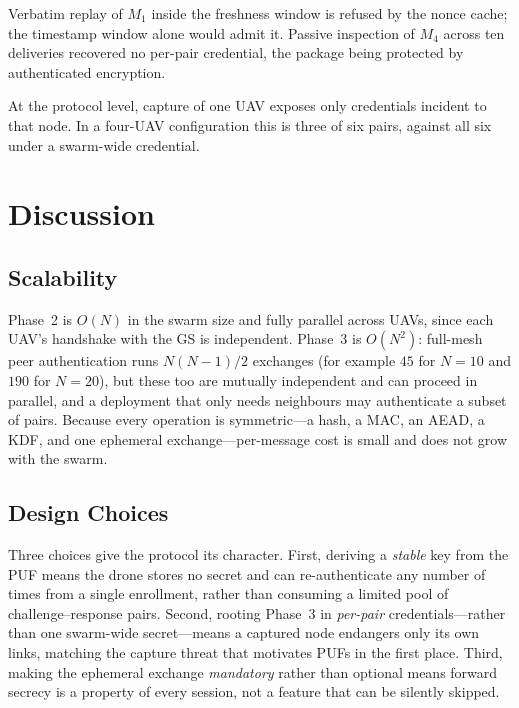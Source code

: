 \documentclass[11pt,a4paper]{article}
\begin{document}
Verbatim replay of $M_1$ inside the freshness window is refused by the nonce cache;
the timestamp window alone would admit it. Passive inspection of $M_4$ across ten
deliveries recovered no per-pair credential, the package being protected by
authenticated encryption.

At the protocol level, capture of one UAV exposes only credentials incident to that
node. In a four-UAV configuration this is three of six pairs, against all six under
a swarm-wide credential.


\section{Discussion}
\label{sec:discussion}

\subsection{Scalability}
Phase~2 is $O(N)$ in the swarm size and fully parallel across UAVs, since each
UAV's handshake with the GS is independent. Phase~3 is $O(N^2)$: full-mesh peer
authentication runs $N(N-1)/2$ exchanges (for example $45$ for $N=10$ and $190$
for $N=20$), but these too are mutually independent and can proceed in
parallel, and a deployment that only needs neighbours may authenticate a subset
of pairs. Because every operation is symmetric---a hash, a MAC, an AEAD, a KDF,
and one ephemeral exchange---per-message cost is small and does not grow with
the swarm.

\subsection{Design Choices}
Three choices give the protocol its character. First, deriving a \emph{stable}
key from the PUF means the drone stores no secret and can re-authenticate any
number of times from a single enrollment, rather than consuming a limited pool
of challenge--response pairs. Second, rooting Phase~3 in \emph{per-pair}
credentials---rather than one swarm-wide secret---means a captured node
endangers only its own links, matching the capture threat that motivates PUFs
in the first place. Third, making the ephemeral exchange \emph{mandatory} rather
than optional means forward secrecy is a property of every session, not a
feature that can be silently skipped.
\end{document}
